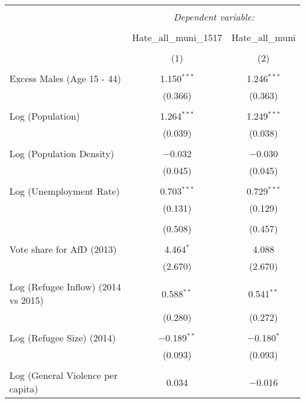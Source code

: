 
\begin{table}[!htbp] \centering 
  \caption{} 
  \label{} 
\begin{tabular}{@{\extracolsep{5pt}}lcc} 
\\[-1.8ex]\hline 
\hline \\[-1.8ex] 
 & \multicolumn{2}{c}{\textit{Dependent variable:}} \\ 
\cline{2-3} 
\\[-1.8ex] & Hate\_all\_muni\_1517 & Hate\_all\_muni \\ 
\\[-1.8ex] & (1) & (2)\\ 
\hline \\[-1.8ex] 
 Excess Males (Age 15 - 44) & 1.150$^{***}$ & 1.246$^{***}$ \\ 
  & (0.366) & (0.363) \\ 
  & & \\ 
 Log (Population) & 1.264$^{***}$ & 1.249$^{***}$ \\ 
  & (0.039) & (0.038) \\ 
  & & \\ 
 Log (Population Density) & $-$0.032 & $-$0.030 \\ 
  & (0.045) & (0.045) \\ 
  & & \\ 
 Log (Unemployment Rate) & 0.703$^{***}$ & 0.729$^{***}$ \\ 
  & (0.131) & (0.129) \\ 
  & & \\ 
  & (0.508) & (0.457) \\ 
  & & \\ 
 Vote share for AfD (2013) & 4.464$^{*}$ & 4.088 \\ 
  & (2.670) & (2.670) \\ 
  & & \\ 
 Log (Refugee Inflow) (2014 vs 2015) & 0.588$^{**}$ & 0.541$^{**}$ \\ 
  & (0.280) & (0.272) \\ 
  & & \\ 
 Log (Refugee Size) (2014) & $-$0.189$^{**}$ & $-$0.180$^{*}$ \\ 
  & (0.093) & (0.093) \\ 
  & & \\ 
 Log (General Violence per capita) & 0.034 & $-$0.016 \\ 

\end{tabular}
\end{table}
